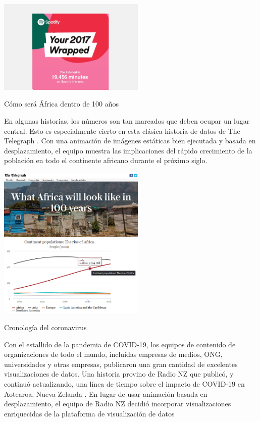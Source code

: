 \documentclass[twoside,twocolumn]{article}
\begin{document}
\includegraphics[width=7cm]{imagenes/img10.png}


Cómo será África dentro de 100 años

En algunas historias, los números son tan marcados que deben ocupar un lugar central. Esto es especialmente cierto en esta clásica historia de datos de The Telegraph . 
Con una animación de imágenes estáticas bien ejecutada y basada en desplazamiento, el equipo muestra las implicaciones del rápido crecimiento de la población en todo el continente africano durante el próximo siglo.

\includegraphics[width=7cm]{imagenes/img11.png}
\includegraphics[width=7cm]{imagenes/img12.png}

Cronología del coronavirus

Con el estallido de la pandemia de COVID-19, los equipos de contenido de organizaciones de todo el mundo, incluidas empresas de medios, ONG, universidades y otras empresas, publicaron una gran cantidad de excelentes visualizaciones de datos. Una historia provino de Radio NZ que publicó, y continuó actualizando, una línea de tiempo sobre el impacto de COVID-19 en Aotearoa, Nueva Zelanda . En lugar de usar animación basada en desplazamiento, el equipo de Radio NZ decidió incorporar visualizaciones enriquecidas de la plataforma de visualización de datos 
\end{document}
